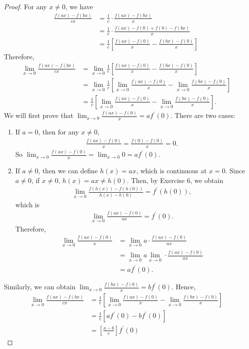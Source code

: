 \documentclass[12pt]{article}
\begin{document}
\begin{proof}
  For any $x\not=0$, we have
  \begin{align*}
    \frac{f(ax)-f(bx)}{cx} &= \frac{1}{c} \cdot \frac{f(ax)-f(bx)}{x}\\
                           &= \frac{1}{c} \cdot \frac{f(ax)-f(0)+f(0)-f(bx)}{x}\\
                           &= \frac{1}{c} \left[ \frac{f(ax)-f(0)}{x} - \frac{f(bx)- f(0)}{x} \right]
  \end{align*}
  Therefore,
  \begin{align*}
   \lim_{x \to 0} \frac{f(ax)-f(bx)}{cx}
   &= \lim_{x \to 0} \frac{1}{c} \left[ \frac{f(ax)-f(0)}{x} - \frac{f(bx)- f(0)}{x} \right] \\
   &= \lim_{x \to 0} \frac{1}{c} \left[ \lim_{x \to 0}\frac{f(ax)-f(0)}{x} - \lim_{x \to 0}\frac{f(bx)- f(0)}{x} \right] \\
   &= \frac{1}{c} \left[ \lim_{x \to 0}\frac{f(ax)-f(0)}{x} - \lim_{x \to 0}\frac{f(bx)- f(0)}{x} \right].
  \end{align*}
  We will first prove that $\lim_{x \to 0}\frac{f(ax)-f(0)}{x} =af^\prime(0)$. There are two cases:
  \begin{enumerate}
    \item If $a=0$, then for any $x \not=0$,
      \begin{align*}
        \frac{f(ax)-f(0)}{x} = \frac{f(0)-f(0)}{x} = 0.
      \end{align*}
      So $\lim_{x \to 0}\frac{f(ax)-f(0)}{x} = \lim_{x \to 0} 0 =af^\prime(0) $.
    \item If $a\not=0$, then we can define $h(x)=ax$, which is continuous at $x=0$. Since $a\not=0$, if $x \not= 0$, $h(x)=ax \not = h(0)$. Then, by Exercise 6, we obtain
      \begin{align*}
        \lim_{x \to 0}\frac{f(h(x))-f(h(0))}{h(x)- h(0)} = f^\prime(h(0)),
      \end{align*}
      which is
      \begin{align*}
        \lim_{x \to 0}\frac{f(ax)-f(0)}{ax} = f^\prime(0).
      \end{align*}
      Therefore,
      \begin{align*}
        \lim_{x \to 0}\frac{f(ax)-f(0)}{x} &= \lim_{x \to 0}a \cdot \frac{f(ax)-f(0)}{ax}\\
                                           &= \lim_{x \to 0}a \lim_{x \to 0}\cdot \frac{f(ax)-f(0)}{ax}\\
                                           &= af^\prime(0).
      \end{align*}
  \end{enumerate}
  Similarly, we can obtain $\lim_{x \to 0}\frac{f(bx)-f(0)}{x} =bf^\prime(0)$. Hence,
  \begin{align*}
   \lim_{x \to 0} \frac{f(ax)-f(bx)}{cx}
   &= \frac{1}{c} \left[ \lim_{x \to 0}\frac{f(ax)-f(0)}{x} - \lim_{x \to 0}\frac{f(bx)- f(0)}{x} \right] \\
   &= \frac{1}{c} \left[ a f^\prime(0)  - b f^\prime(0) \right] \\
   &= \left[ \frac{a-b}{c} \right]  f^\prime(0)
  \end{align*}
\end{proof}
\end{document}
